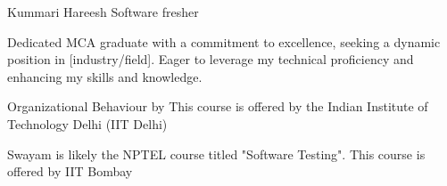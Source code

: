 \documentclass{article}
\begin{document}
 \begin{cv}{Kummari Hareesh }{Software fresher}



Dedicated MCA graduate with a commitment to excellence, seeking a dynamic
position in [industry/field]. Eager to leverage my technical proficiency and enhancing my skills and knowledge.


\begin{cvevent}[2022][2024]
    \end{cvevent}
\begin{cvevent}[2019][2022]
    \end{cvevent}
\begin{cvevent}[2017][2019]
    \end{cvevent}
    
  \begin{cvevent}[2017][2019]
    \end{cvevent}  
    

\begin{cvevent}[2023]
    Organizational Behaviour by
    This course is offered by the Indian Institute of Technology Delhi (IIT Delhi)
    
\end{cvevent}

\cvseparator[2]
\begin{cvevent}[2023]
    Swayam is likely the NPTEL course titled "Software Testing". This course is offered by IIT Bombay 
\end{cvevent}

\begin{cvevent}
\end{cvevent}


\end{cv}
\end{document}
